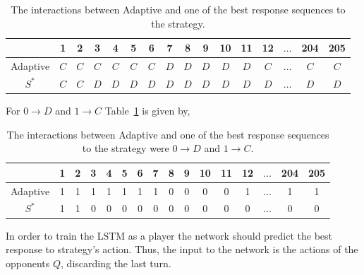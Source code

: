 \begin{table}[htb]
    \centering
    \begin{tabular}{cccccccccccccccc}
        & \textbf{1} & \textbf{2} & \textbf{3} & \textbf{4}  & \textbf{5} & \textbf{6} & \textbf{7} & \textbf{8} & \textbf{9} & \textbf{10} & \textbf{11}  & \textbf{12} &  \(\dots\)  & \textbf{204} &  \textbf{205} \\ 
        \midrule
        Adaptive & \(C\) & \(C\) & \(C\) & \(C\) & \(C\) & \(C\) & \(D\) & \(D\) & \(D\) & \(D\) & \(D\)& \(C\)& \(\dots\) & \(C\) & \(C\) \\
        \(S^*\) & \(C\) & \(C\) & \(D\) & \(D\) & \(D\) & \(D\) & \(D\) & \(D\) & \(D\) & \(D\) & \(D\) & \(D\)& \(\dots\) & \(D\) & \(D\) \\ \bottomrule
    \end{tabular}
    \caption{The interactions between Adaptive and one of the best response sequences
    to the strategy.}\label{table:adaptive_vs_best_response}
    \end{table}

For \(0 \to D\) and \(1 \to C\) Table~\ref{table:adaptive_vs_best_response} is given by,

\begin{table}[htbp]
    \centering
    \begin{tabular}{cccccccccccccccc}
        & \textbf{1} & \textbf{2} & \textbf{3} & \textbf{4}  & \textbf{5} & \textbf{6} & \textbf{7} & \textbf{8} & \textbf{9} & \textbf{10} & \textbf{11} &  \textbf{12} & \(\dots\)  & \textbf{204} &  \textbf{205} \\ 
        \midrule
        Adaptive & 1 & 1 & 1 & 1 & 1 & 1 & 1 & 0 & 0 & 0 & 0& 1& \(\dots\) & 1 & 1 \\
        \(S^*\) & 1 & 1 & 0 & 0 & 0 & 0 & 0 & 0 & 0 & 0 & 0 & 0& \(\dots\) & 0 & 0 \\ \bottomrule
    \end{tabular}
    \caption{The interactions between Adaptive and one of the best response sequences
    to the strategy were \(0 \to D\) and \(1 \to C\).}\label{table:adaptive_vs_best_response_binary}
\end{table}

In order to train the LSTM as a player the network should predict the best
response to strategy's action. Thus, the input to the network is the actions of
the opponents \(Q\), discarding the last turn.

\begin{figure}[!htbp]
    \centering
    
\end{figure}

